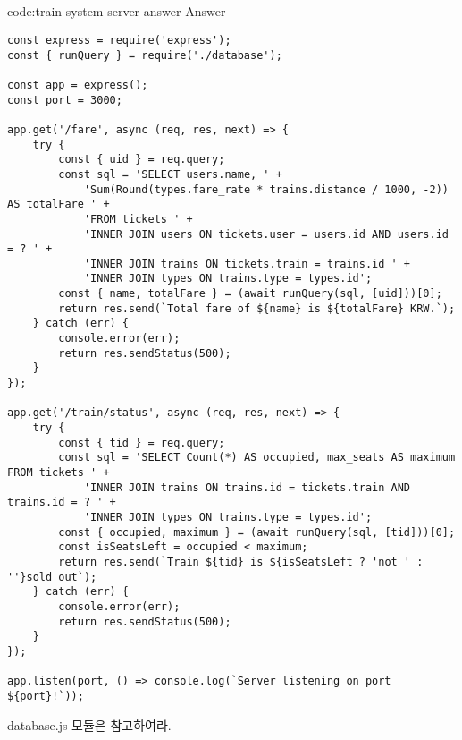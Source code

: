 \subsection*{}

\begin{codeenv}{code:train-system-server-answer}{ Answer}\begin{verbatim}
const express = require('express');
const { runQuery } = require('./database');

const app = express();
const port = 3000;

app.get('/fare', async (req, res, next) => {
    try {
        const { uid } = req.query;
        const sql = 'SELECT users.name, ' +
            'Sum(Round(types.fare_rate * trains.distance / 1000, -2)) AS totalFare ' +
            'FROM tickets ' +
            'INNER JOIN users ON tickets.user = users.id AND users.id = ? ' +
            'INNER JOIN trains ON tickets.train = trains.id ' +
            'INNER JOIN types ON trains.type = types.id';
        const { name, totalFare } = (await runQuery(sql, [uid]))[0];
        return res.send(`Total fare of ${name} is ${totalFare} KRW.`);
    } catch (err) {
        console.error(err);
        return res.sendStatus(500);
    }
});

app.get('/train/status', async (req, res, next) => {
    try {
        const { tid } = req.query;
        const sql = 'SELECT Count(*) AS occupied, max_seats AS maximum FROM tickets ' +
            'INNER JOIN trains ON trains.id = tickets.train AND trains.id = ? ' +
            'INNER JOIN types ON trains.type = types.id';
        const { occupied, maximum } = (await runQuery(sql, [tid]))[0];
        const isSeatsLeft = occupied < maximum;
        return res.send(`Train ${tid} is ${isSeatsLeft ? 'not ' : ''}sold out`);
    } catch (err) {
        console.error(err);
        return res.sendStatus(500);
    }
});

app.listen(port, () => console.log(`Server listening on port ${port}!`));
\end{verbatim}
\end{codeenv}

database.js 모듈은 \과 \를 참고하여라.
